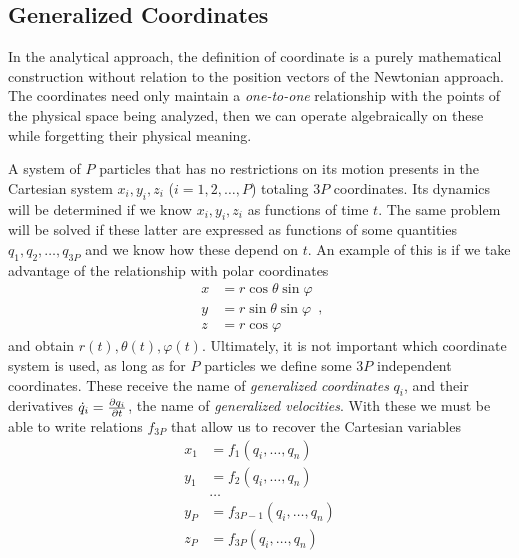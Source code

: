 \documentclass[12pt, spanish, a4paper, ]{article}
\begin{document}
\subsection{Generalized Coordinates}\label{generalized}
In the analytical approach, the definition of coordinate is a purely mathematical construction without relation to the position vectors of the Newtonian approach.
The coordinates need only maintain a \emph{one-to-one} relationship with the points of the physical space being analyzed, then we can operate algebraically on these while forgetting their physical meaning.

A system of \(P\) particles that has no restrictions on its motion presents in the Cartesian system \(x_i, y_i, z_i\) (\(i=1, 2, \ldots, P\)) totaling \(3P\) coordinates.
Its dynamics will be determined if we know \(x_i, y_i, z_i\) as functions of time \(t\).
The same problem will be solved if these latter are expressed as functions of some quantities \(q_1, q_2, \ldots, q_{3P}\) and we know how these depend on \(t\).
An example of this is if we take advantage of the relationship with polar coordinates
\begin{equation}\label{Lanczos12.3}
	\begin{aligned}
		x &= r \cos{\theta} \sin{\varphi}\\
		y &= r \sin{\theta} \sin{\varphi}\\
		z &= r \cos{\varphi}
	\end{aligned},
	\tag{Lanczos 12.3}
\end{equation}
and obtain \(r(t), \theta(t), \varphi(t)\).
Ultimately, it is not important which coordinate system is used, as long as for \(P\) particles we define some \(3P\) independent coordinates.
These receive the name of \emph{generalized coordinates} \(q_i\), and their derivatives \(\dot{q}_i= \pdv{q_i}{t}\), the name of \emph{generalized velocities}.
With these we must be able to write relations \(f_{3P}\) that allow us to recover the Cartesian variables
\begin{equation}\label{Lanczos12.8}
	\begin{aligned}
		x_1 &= f_1(q_i, \ldots, q_n) \\
		y_1 &= f_2(q_i, \ldots, q_n) \\
		& \ldots \\
		y_P &= f_{3P-1}(q_i, \ldots, q_n) \\
		z_P &= f_{3P}(q_i, \ldots, q_n)
	\end{aligned}
	\tag{Lanczos 12.8}
\end{equation}
\end{document}
